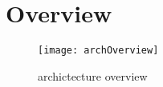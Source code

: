 
\chapter{\vc{} Overview} %

\label{AppendixC} %

\begin{figure}[!htbp]
	\centering
	\texttt{[image: archOverview]}
	\caption{\vc{} archictecture overview}
\end{figure}
